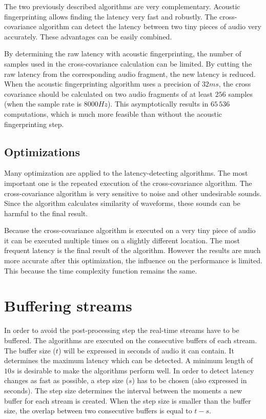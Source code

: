 \documentclass[twocolumn]{phdsymp} %
\begin{document}
The two previously described algorithms are very complementary. Acoustic fingerprinting allows finding the latency very fast and robustly. The cross-covariance algorithm can detect the latency between two tiny pieces of audio very accurately. These advantages can be easily combined.

By determining the raw latency with acoustic fingerprinting, the number of samples used in the cross-covariance calculation can be limited. By cutting the raw latency from the corresponding audio fragment, the new latency is reduced. When the acoustic fingerprinting algorithm uses a precision of $32ms$, the cross covariance should be calculated on two audio fragments of at least $256$ samples (when the sample rate is $8000Hz$). This asymptotically results in $65\,536$ computations, which is much more feasible than without the acoustic fingerprinting step.

\subsection{Optimizations}

Many optimization are applied to the latency-detecting algorithms. The most important one is the repeated execution of the cross-covariance algorithm. The cross-covariance algorithm is very sensitive to noise and other undesirable sounds. Since the algorithm calculates similarity of waveforms, these sounds can be harmful to the final result.

Because the cross-covariance algorithm is executed on a very tiny piece of audio it can be executed multiple times on a slightly different location. The most frequent latency is the final result of the algorithm. However the results are much more accurate after this optimization, the influence on the performance is limited. This because the time complexity function remains the same.

\section{Buffering streams}

In order to avoid the post-processing step the real-time streams have to be buffered.
The algorithms are executed on the consecutive buffers of each stream. The buffer size ($t$) will be expressed in seconds of audio it can contain. It determines the maximum latency which can be detected. A minimum length of $10s$ is desirable to make the algorithms perform well. In order to detect latency changes as fast as possible, a step size ($s$) has to be chosen (also expressed in seconds). The step size determines the interval between the moments a new buffer for each stream is created. When the step size is smaller than the buffer size, the overlap between two consecutive buffers is equal to $ t - s $.
\end{document}
